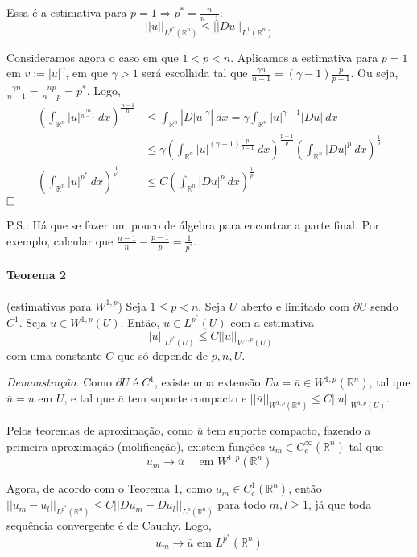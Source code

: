 \documentclass[a4paper, 11pt]{book}
\newcommand{\qed}{$\hfill\square$}
\newcommand{\Rn}{{\mathbb{R}^n}}
\newcommand{\pu}{\partial U}
\newcommand{\nor}[2]{||#1||_{#2}}
\begin{document}
Essa é a estimativa para $p=1 \Rightarrow p^* = \frac{n}{n-1}$: \[ ||u||_{L^{p^*}(\Rn)} \leq ||Du||_{L^1(\Rn)} \]



Consideramos agora o caso em que $ 1 < p < n $. Aplicamos a estimativa para $p=1$ em $v:= |u|^\gamma$, em que $\gamma>1$ será escolhida tal que $ \frac{\gamma n}{n-1} = (\gamma -1 ) \frac{p}{p-1} $. Ou seja, $ \frac{\gamma n}{n-1} = \frac{np}{n-p} = p^*$. Logo, \begin{align*}
	\left(\int_\Rn |u|^{\frac{\gamma n}{n-1}}\ dx \right)^{\frac{n-1}{n}} &\leq \int_\Rn \left| D|u|^\gamma \right|\ dx = \gamma \int_\Rn |u|^{\gamma -1} |Du|\ dx \\
	&\leq \gamma \left(  \int_\Rn |u|^{(\gamma -1) \frac{p}{p-1}}\ dx \right)^{\frac{p-1}{p}} \left( \int_\Rn |Du|^p\ dx \right)^{\frac{1}{p}} \\
	\left(\int_\Rn |u|^{p^*}\ dx \right)^{\frac{1}{p^*}} &\leq C \left( \int_\Rn |Du|^p\ dx \right)^{\frac{1}{p}}
\end{align*}\qed


P.S.: Há que se fazer um pouco de álgebra para encontrar a parte final. Por exemplo, calcular que $ \frac{n-1}{n} - \frac{p-1}{p} = \frac{1}{p^*}$.



\paragraph{Teorema 2}\label{t:sobolev-ineq-t2}(estimativas para \( W^{1,p} \)) Seja \( 1\leq p < n \). Seja \(U\) aberto e limitado com \(\partial U\) sendo \(C^1\). Seja \(u \in W^{1,p}(U)\). Então, \(u \in L^{p^*}(U)\) com a estimativa \[ ||u||_{L^{p^*}(U)} \leq C ||u||_{W^{1,p}(U)} \] com uma constante \(C\) que só depende de \(p, n, U\).

\textit{Demonstração.} Como $\pu$ é $C^1$, existe uma extensão $Eu=\overline{u} \in W^{1,p}(\Rn)$, tal que $\overline{u}=u \text{ em } U$, e tal que $\overline{u}$ tem suporte compacto e $ \nor{\overline{u}}{W^{1,p}(\Rn)} \leq C \nor{u}{W^{1,p}(U)} $.

Pelos teoremas de aproximação, como $\overline{u}$ tem suporte compacto, fazendo a primeira aproximação (molificação), existem funções $ u_m \in C^\infty_c(\Rn) $ tal que \[ u_m \rightarrow \overline{u} \quad \text{ em } W^{1,p}(\Rn) \]

Agora, de acordo com o Teorema 1, como $u_m \in C^1_c(\Rn)$, então $ ||u_m - u_l||_{L^{p^*}(\Rn)} \leq C ||Du_m  - Du_l||_{L^p(\Rn)} $ para todo $m,l \geq 1$, já que toda sequência convergente é de Cauchy. Logo, \[ u_m \rightarrow \overline{u} \text{ em } L^{p^*}(\Rn) \]
\end{document}
